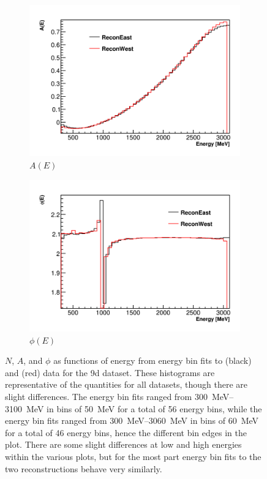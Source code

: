 \begin{figure}
    \begin{subfigure}[t]{0.45\textwidth}
        \centering
        \includegraphics[width=\textwidth]{ReconEastvWest_A}
        \caption{$A(E)$}
    \end{subfigure}
    \hspace{1mm}
    \begin{subfigure}[t]{0.45\textwidth}
        \centering
        \includegraphics[width=\textwidth]{ReconEastvWest_Phi}
        \caption{$\phi(E)$}
    \end{subfigure}
\caption[]{$N$, $A$, and $\phi$ as functions of energy from energy bin fits to \RE (black) and \RW (red) data for the 9d dataset. These histograms are representative of the quantities for all datasets, though there are slight differences. The \RE energy bin fits ranged from \SIrange{300}{3100}{\MeV} in bins of \SI{50}{\MeV} for a total of 56 energy bins, while the \RW energy bin fits ranged from \SIrange{300}{3060}{\MeV} in bins of \SI{60}{\MeV} for a total of 46 energy bins, hence the different bin edges in the plot. There are some slight differences at low and high energies within the various plots, but for the most part energy bin fits to the two reconstructions behave very similarly.}
\label{fig:energyBinFits}
\end{figure}




